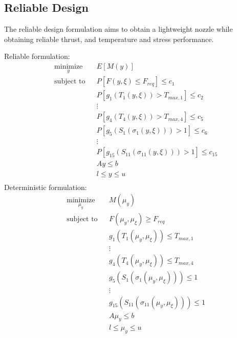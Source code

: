 \documentclass{article}
\begin{document}
\subsection{Reliable Design}

The reliable design formulation aims to obtain a lightweight nozzle while obtaining reliable thrust, and temperature and stress performance.

\begin{multicols}{2}
\centering
Reliable formulation:
\begin{equation}
\label{eq:general_reliable_optim}
\begin{aligned}
& \underset{y}{\text{minimize}}
& & E[M(y)] \\
& \text{subject to}
& & P \left[ F(y,\xi) \leq F_{req} \right] \leq c_1 \\
& & & P \left[ g_1 \left( T_1(y,\xi) \right) > T_{max,1} \right] \leq c_{2} \\
& & & \vdots \\
& & & P \left[ g_4 \left( T_4(y,\xi) \right) > T_{max,4} \right] \leq c_{5} \\
& & & P \left[ g_5 \left( S_1 ( \sigma_1(y,\xi) ) \right) > 1 \right] \leq c_{6} \\
& & & \vdots \\
& & & P \left[ g_{15} \left( S_{11} ( \sigma_{11}(y,\xi) ) \right) > 1 \right] \leq c_{15} \\
& & & Ay \leq b \\
& & & l \leq y \leq u \\
\end{aligned}
\end{equation}
\vfill \columnbreak
Deterministic formulation: 
\begin{equation}
\label{eq:general_reliable_equiv_deterministic_optim}
\begin{aligned}
& \underset{\mu_y}{\text{minimize}}
& & M(\mu_y) \\
& \text{subject to}
& & F(\mu_y,\mu_{\xi}) \geq F_{req} \\
& & & g_1 \left( T_1(\mu_y,\mu_{\xi}) \right) \leq T_{max,1} \\
& & & \vdots \\
& & & g_4 \left( T_4(\mu_y,\mu_{\xi}) \right) \leq T_{max,4} \\
& & & g_5 \left( S_1 ( \sigma_1(\mu_y,\mu_{\xi}) ) \right) \leq 1 \\
& & & \vdots \\
& & & g_{15} \left( S_{11} ( \sigma_{11}(\mu_y,\mu_{\xi}) ) \right) \leq 1 \\
& & & A\mu_y \leq b \\
& & & l \leq \mu_y \leq u \\
\end{aligned}
\end{equation}
\end{multicols}
\end{document}
